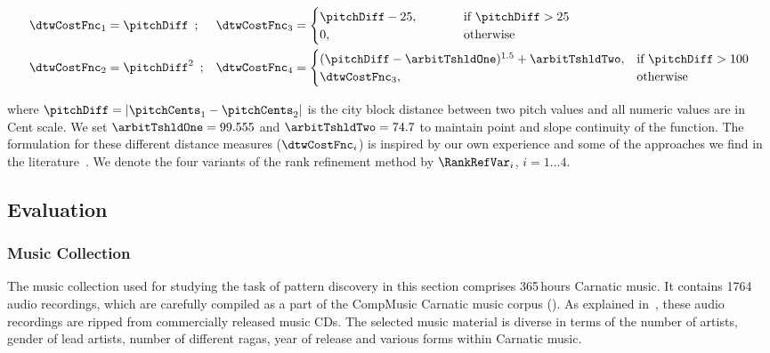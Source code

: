 \begin{equation}
\begin{aligned}
\dtwCostFnc_1& = \pitchDiff \hspace{.5em};&
\dtwCostFnc_3& = 
\begin{cases}
\pitchDiff-25, & \hspace{1cm} \text{if } \pitchDiff >25\\
0, & \hspace{1cm}\text{otherwise } 
\end{cases}
\\
\dtwCostFnc_2& = \pitchDiff^2 \hspace{.5em};&
\dtwCostFnc_4 &= 
\begin{cases}
(\pitchDiff-\arbitTshldOne)^{1.5} + \arbitTshldTwo, & \text{if } \pitchDiff >100\\
\dtwCostFnc_3, & \text{otherwise}
\end{cases}
\end{aligned}
\label{eq:distance_measures_discovery}
\end{equation}

\noindent where $\pitchDiff = |\pitchCents_1-\pitchCents_2|$ is the city block distance between two pitch values and all numeric values are in Cent scale. We set $\arbitTshldOne =99.555$ and $\arbitTshldTwo = 74.7$ to maintain point and slope continuity of the function. The formulation for these different distance measures ($\dtwCostFnc_i$) is inspired by our own experience and some of the approaches we find in the literature~\citep{Ishwar2013,Rao2014}. We denote the four variants of the rank refinement method by $\RankRefVar_i$, $i=1\dots 4$.


\subsection{Evaluation}

\subsubsection{Music Collection}
\label{sec:pattern_discovery_musiccollection}

The music collection used for studying the task of pattern discovery in this section comprises 365\,hours Carnatic music. It contains 1764 audio recordings, which are carefully compiled as a part of the CompMusic Carnatic music corpus (). As explained in~, these audio recordings are ripped from commercially released music CDs. The selected music material is diverse in terms of the number of artists, gender of lead artists, number of different \glspl{raga}, year of release and various forms within Carnatic music.

